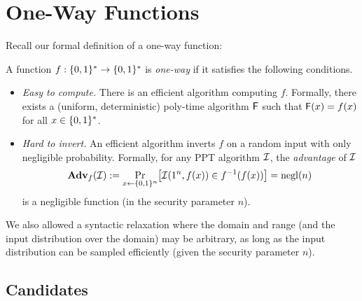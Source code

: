 \documentclass[11pt]{article}
\begin{document}
\thispagestyle{fancy}           %


\section{One-Way Functions}
\label{sec:one-way-functions}

Recall our formal definition of a one-way function:
\begin{definition}
  \label{def:owf}
  A function $f : \{0,1\}^{*} \to \{0,1\}^{*}$ is \emph{one-way} if it
  satisfies the following conditions.
  \begin{itemize}
  \item \emph{Easy to compute.}  There is an efficient algorithm
    computing $f$.  Formally, there exists a (uniform, deterministic)
    poly-time algorithm $\mathsf{F}$ such that $\mathsf{F}(x) = f(x)$ for
    all $x \in \{0,1\}^{*}$.
  \item \emph{Hard to invert.}  An efficient algorithm inverts $f$ on
    a random input with only negligible probability.  Formally, for
    any PPT algorithm $\mathcal{I}$, the \emph{advantage} of
    $\mathcal{I}$ \[ \advan_{f}(\Inv) := \Pr_{x \gets \bit^{n}} \bracks*{
      \Inv(1^{n}, f(x)) \in f^{-1}(f(x)) } = \negl(n) \] is a
    negligible function (in the security parameter $n$).
  \end{itemize}
\end{definition}
We also allowed a syntactic relaxation where the domain and range (and
the input distribution over the domain) may be arbitrary, as long as
the input distribution can be sampled efficiently (given the security
parameter $n$).

\subsection{Candidates}
\label{sec:candidates}
\end{document}
